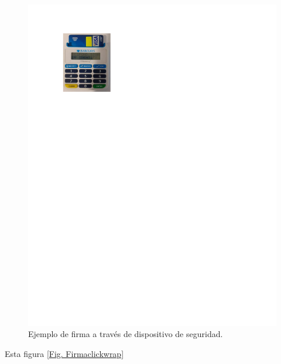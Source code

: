\documentclass[12pt]{report} %
\begin{document}
\begin{itemize}
\begin{figure}
\centering
\includegraphics[width=0.85\columnwidth]{imagenes/firmadispositivo.pdf}
\caption{Ejemplo de firma a través de dispositivo de seguridad.}
\label{Fig. Firmadispositivo}
\end{figure} 

Esta figura \ref{Fig. Firmaclickwrap}


\end{itemize}
\end{document}
